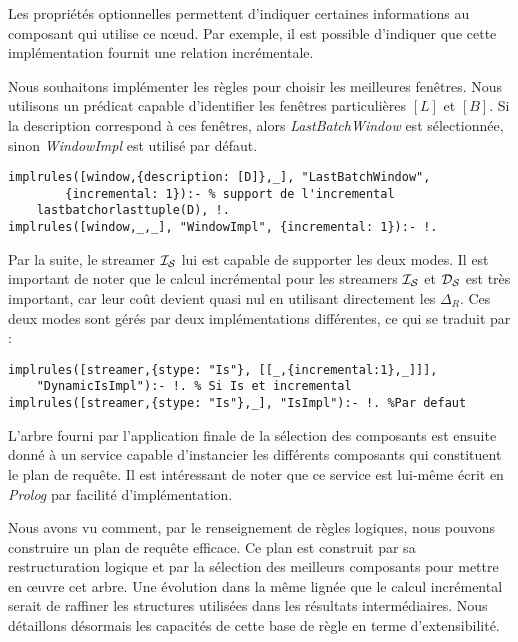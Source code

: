Les propriétés optionnelles permettent d'indiquer certaines informations au composant qui utilise ce nœud. Par exemple, il est possible d'indiquer que cette implémentation fournit une relation incrémentale.
\begin{example}
	Nous souhaitons implémenter les règles pour choisir les meilleures fenêtres. Nous utilisons un prédicat capable d'identifier les fenêtres particulières $[L]$ et $[B]$. Si la description correspond à ces fenêtres, alors \textit{LastBatchWindow} est sélectionnée, sinon \textit{WindowImpl} est utilisé par défaut.
\begin{lstlisting}
implrules([window,{description: [D]},_], "LastBatchWindow", 
        {incremental: 1}):- % support de l'incremental
    lastbatchorlasttuple(D), !.
implrules([window,_,_], "WindowImpl", {incremental: 1}):- !.
\end{lstlisting}
\end{example}

\begin{example}
Par la suite, le streamer $\mathcal{I_S}$ lui est capable de supporter les deux modes. Il est important de noter que le calcul incrémental pour les streamers $\mathcal{I_S}$ et $\mathcal{D_S}$ est très important, car leur coût devient quasi nul en utilisant directement les $\Delta_R$. Ces deux modes sont gérés par deux implémentations différentes, ce qui se traduit par :
\begin{lstlisting}
implrules([streamer,{stype: "Is"}, [[_,{incremental:1},_]]], 
    "DynamicIsImpl"):- !. % Si Is et incremental
implrules([streamer,{stype: "Is"},_], "IsImpl"):- !. %Par defaut
\end{lstlisting}
\end{example}

L'arbre fourni par l'application finale de la sélection des composants est ensuite donné à un service capable d'instancier les différents composants qui constituent le plan de requête. Il est intéressant de noter que ce service est lui-même écrit en \textit{Prolog} par facilité d'implémentation.

Nous avons vu comment, par le renseignement de règles logiques, nous pouvons construire un plan de requête efficace. Ce plan est construit par sa restructuration logique et par la sélection des meilleurs composants pour mettre en œuvre cet arbre. Une évolution dans la même lignée que le calcul incrémental serait de raffiner les structures utilisées dans les résultats intermédiaires. Nous détaillons désormais les capacités de cette base de règle en terme d'extensibilité.
